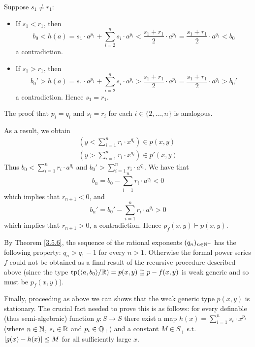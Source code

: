 \documentclass[11pt]{article}
\begin{document}
\begin{itemize}
Suppose \(s_1\neq r_1\):
\begin{itemize}
\item If \(s_1<r_1\), then
\begin{equation*}
b_0<h(a)=s_1\cdot a^{p_1}+\sum_{i=2}^ns_i\cdot a^{p_i}<\frac{s_1+r_1}{2}\cdot a^{p_1}=\frac{s_1+r_1}{2}\cdot a^{q_1}<b_0
\end{equation*}
a contradiction.
\item If \(s_1>r_1\), then
\begin{equation*}
b_0'>h(a)=s_1\cdot a^{p_1}+\sum_{i=2}^ns_i\cdot a^{p_i}>\frac{s_1+r_1}{2}\cdot a^{p_1}=\frac{s_1+r_1}{2}\cdot a^{q_1}>b_0'
\end{equation*}
a contradiction. Hence \(s_1=r_1\).
\end{itemize}
The proof that \(p_i=q_i\) and \(s_i=r_i\) for each \(i\in\{2,\dots,n\}\) is analogous.

As a result, we obtain
\begin{gather*}
(y<\sum_{i=1}^nr_i\cdot x^{q_i})\in p(x,y)\\
(y>\sum_{i=1}^nr_i\cdot x^{q_i})\in p'(x,y)
\end{gather*}
Thus \(b_0<\sum_{i=1}^nr_i\cdot a^{q_i}\) and \(b_0'>\sum_{i=1}^nr_i\cdot a^{q_i}\). We have that
\begin{equation*}
b_n=b_0-\sum_{i=1}^nr_i\cdot a^{q_i}<0
\end{equation*}
which implies that \(r_{n+1}<0\), and
\begin{equation*}
b_n'=b_0'-\sum_{i=1}^nr_i\cdot a^{q_i}>0
\end{equation*}
which implies that \(r_{n+1}>0\), a contradiction. Hence \(p_f(x,y)\vdash p(x,y)\).

By Theorem \ref{3.5.6}, the sequence of the rational exponents \((q_n)_{n\in\mathbb{N}^+}\) has the
following property: \(q_n>q_1-1\) for every \(n>1\). Otherwise the formal power series \(f\)
could not be obtained as a final result of the recursive procedure described above (since the
type \(\operatorname{tp}(\langle a,b_0\rangle/\mathbb{R})=p(x,y)\supseteq p-f(x,y)\) is weak generic and so must be \(p_f(x,y)\)).

Finally, proceeding as above we can shows that the weak generic type \(p(x,y)\) is stationary.
The crucial fact needed to prove this is as follows: for every definable (thus semi-algebraic)
function \(g:S\to S\) there exist a map \(h(x)=\sum_{i=1}^ns_i\cdot x^{p_i}\) (where \(n\in\mathbb{N}\), \(s_i\in\mathbb{R}\) and
\(p_i\in\mathbb{Q}_+\)) and a constant \(M\in S_+\) s.t. \(\abs{g(x)-h(x)}\le M\) for all sufficiently
large \(x\).
\end{itemize}
\end{document}
